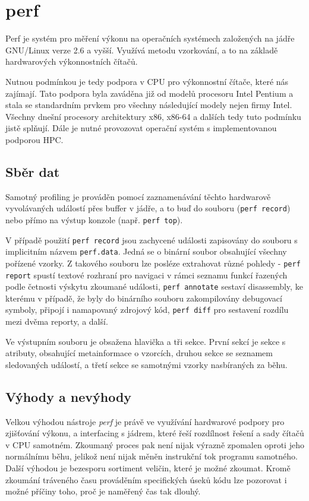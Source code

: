 \documentclass[czech,BP]{thesiskiv}
\begin{document}
\section{perf}\label{subsec:perf}

Perf je systém pro měření výkonu na operačních systémech založených na jádře GNU/Linux verze 2.6 a vyšší. Využívá metodu vzorkování, a to na základě hardwarových výkonnostních čítačů.

Nutnou podmínkou je tedy podpora v CPU pro výkonnostní čítače, které nás zajímají. Tato podpora byla zaváděna již od modelů procesoru Intel Pentium\cite{perf3} a stala se standardním prvkem pro všechny následující modely nejen firmy Intel. Všechny dnešní procesory architektury x86, x86-64 a dalších tedy tuto podmínku jistě splňují. Dále je nutné provozovat operační systém s implementovanou podporou HPC.

\subsection*{Sběr dat}\label{subsubsec:perf-collect}

Samotný profiling je prováděn pomocí zaznamenávání těchto hardwarově vyvolávaných událostí přes buffer v jádře, a to buď do souboru (\texttt{perf record}) nebo přímo na výstup konzole (např. \texttt{perf top}).

V případě použití \texttt{perf record} jsou zachycené události zapisovány do souboru s implicitním názvem \texttt{perf.data}. Jedná se o binární soubor obsahující všechny pořízené vzorky. Z takového souboru lze posléze extrahovat různé pohledy - \texttt{perf report} spustí textové rozhraní pro navigaci v rámci seznamu funkcí řazených podle četnosti výskytu zkoumané události, \texttt{perf annotate} sestaví disassembly, ke kterému v případě, že byly do binárního souboru zakompilovány debugovací symboly, připojí i namapovaný zdrojový kód, \texttt{perf diff} pro sestavení rozdílu mezi dvěma reporty, a další.

Ve výstupním souboru je obsažena hlavička a tři sekce. První sekcí je sekce s atributy, obsahující metainformace o vzorcích, druhou sekce se seznamem sledovaných událostí, a třetí sekce se samotnými vzorky nasbíraných za běhu\cite{perf2}.

\subsection*{Výhody a nevýhody}

Velkou výhodou nástroje \emph{perf} je právě ve využívání hardwarové podpory pro zjišťování výkonu, a interfacing s jádrem, které řeší rozdílnost řešení a sady čítačů v CPU samotném. Zkoumaný proces pak není nijak výrazně zpomalen oproti jeho normálnímu běhu, jelikož není nijak měněn instrukční tok programu samotného. Další výhodou je bezesporu sortiment veličin, které je možné zkoumat. Kromě  zkoumání tráveného času prováděním specifických úseků kódu lze pozorovat i možné příčiny toho, proč je naměřený čas tak dlouhý.
\end{document}
